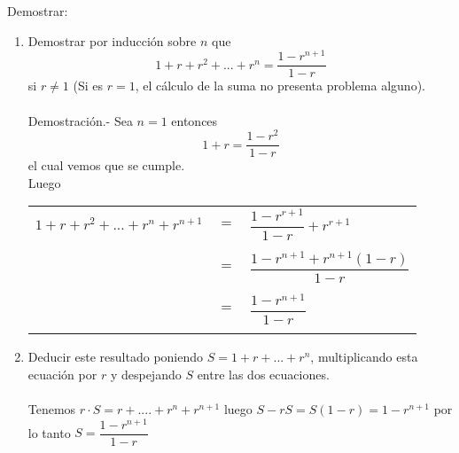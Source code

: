 \begin{teo}Demostrar:
\begin{enumerate}[\bfseries a)]
\item Demostrar por inducción sobre $n$ que $$1 + r +r^2 + ... + r^n = \dfrac{1 - r^{n+1}}{1-r}$$ si $r\neq 1$ (Si es $r=1$, el cálculo de la suma no presenta problema alguno).\\\\
Demostración.- \; Sea $n=1$ entonces $$1+r = \dfrac{1- r^2}{1-r}$$ el cual vemos que se cumple.\\
Luego
\begin{center}
\begin{tabular}{r c l}
$1+r+r^2 + ... + r^n + r^{n+1}$&$=$&$\dfrac{1- r^{r+1}}{1-r} + r^{r+1}$\\\\
&$=$&$\dfrac{1 - r^{n+1} + r^{n+1} (1-r)}{1-r}$\\\\
&$=$&$\dfrac{1 - r^{n+1}}{1-r}$\\\\
\end{tabular}
\end{center} 

\item Deducir este resultado poniendo $S=1+r+...+r^n$, multiplicando esta ecuación por $r$ y despejando $S$ entre las dos ecuaciones.\\\\
Tenemos $r\cdot S = r + .... + r^n + r^{n+1}$ luego $S - rS = S(1-r) = 1-r^{n+1}$ por lo tanto $S = \dfrac{1-r^{n+1}}{1-r}$\\\\
\end{enumerate}
\end{teo}

